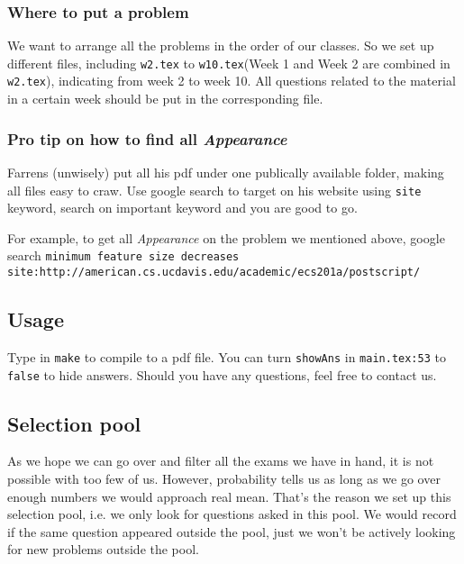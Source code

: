 
\subsubsection*{Where to put a problem}

We want to arrange all the problems in the order of our classes.
So we set up different files, including \texttt{w2.tex} to \texttt{w10.tex}(Week 1 and Week 2 are combined in \texttt{w2.tex}), indicating from week 2 to week 10.
All questions related to the material in a certain week should be put in the corresponding file.

\subsubsection*{Pro tip on how to find all \textit{Appearance}}

Farrens (unwisely) put all his pdf under one publically available folder, making all files easy to craw.
Use google search to target on his website using \texttt{site} keyword, search on important keyword and you are good to go.

For example, to get all \textit{Appearance} on the problem we mentioned above, google search \texttt{minimum feature size decreases site:http://american.cs.ucdavis.edu/academic/ecs201a/postscript/}

\subsection*{Usage}

Type in \lstinline{make} to compile to a pdf file. 
You can turn \lstinline{showAns} in \texttt{main.tex:53} to \lstinline{false} to hide answers.
Should you have any questions, feel free to contact us.

\subsection*{Selection pool}

As we hope we can go over and filter all the exams we have in hand, it is not possible with too few of us.
However, probability tells us as long as we go over enough numbers we would approach real mean.
That's the reason we set up this selection pool, i.e. we only look for questions asked in this pool. 
We would record if the same question appeared outside the pool, just we won't be actively looking for new problems outside the pool.

